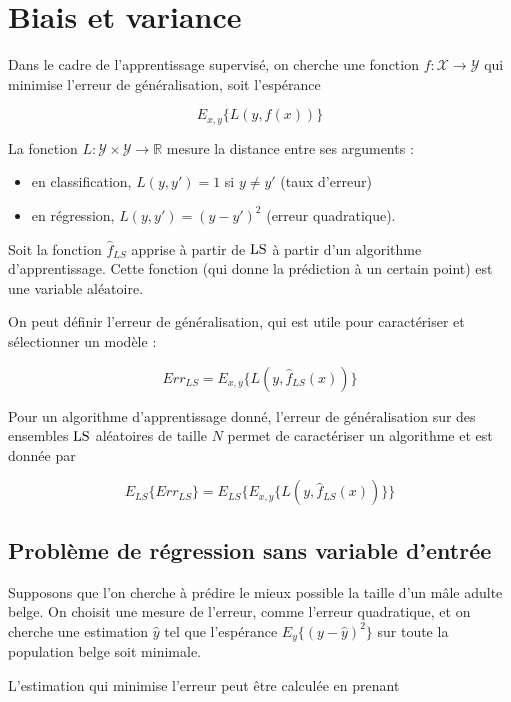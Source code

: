\chapter{Biais et variance}

Dans le cadre de l'apprentissage supervisé, on cherche une fonction $f : \mathcal{X} \rightarrow \mathcal{Y}$ qui minimise l'erreur de généralisation, soit l'espérance

$$E_{x, y} \{L(y, f(x))\}$$

La fonction $L : \mathcal{Y} \times \mathcal{Y} \rightarrow \mathbb{R}$ mesure la distance entre ses arguments :

\begin{itemize}
	\item en classification, $L(y, y') = 1$ si $y \neq y'$ (taux d'erreur)
	\item en régression, $L(y, y') = (y - y')^2$ (erreur quadratique).
\end{itemize}

Soit la fonction $\hat{f}_{LS}$ apprise à partir de $\text{LS}$ à partir d'un algorithme d'apprentissage. Cette fonction (qui donne la prédiction à un certain point) est une variable aléatoire.


On peut définir l'erreur de généralisation, qui est utile pour caractériser et sélectionner un modèle :

$$Err_{LS} = E_{x, y} \{L(y, \hat{f}_{LS}(x))\}$$

Pour un algorithme d'apprentissage donné, l'erreur de généralisation sur des ensembles $\text{LS}$ aléatoires de taille $N$ permet de caractériser un algorithme et est donnée par

$$E_{LS}\{Err_{LS}\} = E_{LS}\{E_{x, y} \{L(y, \hat{f}_{LS}(x))\} \}$$

	\section{Problème de régression sans variable d'entrée}
	
	Supposons que l'on cherche à prédire le mieux possible la taille d'un mâle adulte belge. On choisit une mesure de l'erreur, comme l'erreur quadratique, et on cherche une estimation $\hat{y}$ tel que l'espérance $E_y\{(y - \hat{y})^2\}$ sur toute la population belge soit minimale.
	
	
	L'estimation qui minimise l'erreur peut être calculée en prenant 
	
